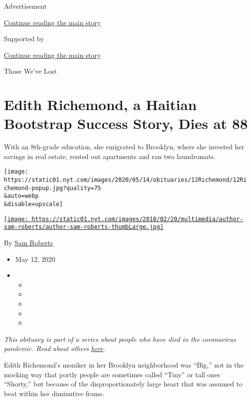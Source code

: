 Advertisement

\protect\hyperlink{after-top}{Continue reading the main story}

Supported by

\protect\hyperlink{after-sponsor}{Continue reading the main story}

Those We've Lost

\hypertarget{edith-richemond-a-haitian-bootstrap-success-story-dies-at-88}{%
\section{Edith Richemond, a Haitian Bootstrap Success Story, Dies at
88}\label{edith-richemond-a-haitian-bootstrap-success-story-dies-at-88}}

With an 8th-grade education, she emigrated to Brooklyn, where she
invested her savings in real estate, rented out apartments and ran two
laundromats.

\texttt{[image: https://static01.nyt.com/images/2020/05/14/obituaries/12Richemond/12Richemond-popup.jpg?quality=75\\\&auto=webp\\\&disable=upscale]}

\href{https://www.nytimes.com/by/sam-roberts}{\texttt{[image: https://static01.nyt.com/images/2018/02/20/multimedia/author-sam-roberts/author-sam-roberts-thumbLarge.jpg]}}

By \href{https://www.nytimes.com/by/sam-roberts}{Sam Roberts}

\begin{itemize}
\item
  May 12, 2020
\item
  \begin{itemize}
  \item
  \item
  \item
  \item
  \item
  \end{itemize}
\end{itemize}

\emph{This obituary is part of a series about people who have died in
the coronavirus pandemic. Read about others}
\href{https://www.nytimes.com/series/people-who-have-died-of-the-coronavirus}{\emph{here}}\emph{.}

Edith Richemond's moniker in her Brooklyn neighborhood was ``Big,'' not
in the mocking way that portly people are sometimes called ``Tiny'' or
tall ones ``Shorty,'' but because of the disproportionately large heart
that was assumed to beat within her diminutive frame.

